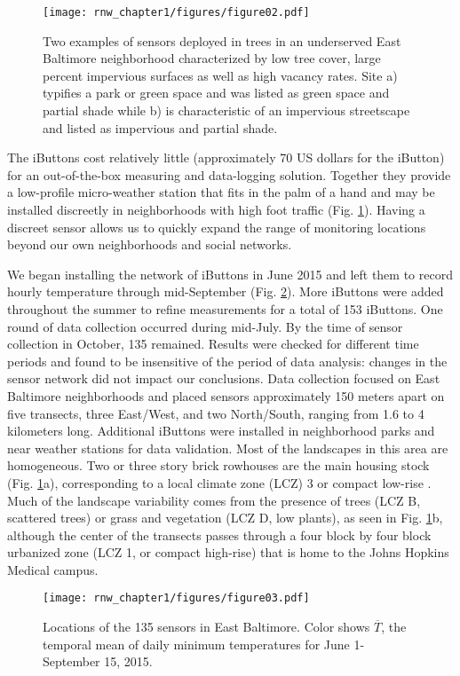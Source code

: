 \begin{figure}
\noindent\texttt{[image: rnw\_chapter1/figures/figure02.pdf]}
\caption{Two examples of sensors deployed in trees in an underserved East Baltimore neighborhood characterized by low tree cover, large percent impervious surfaces as well as high vacancy rates. Site a) typifies a park or green space and was listed as green space and partial shade while b) is characteristic of an impervious streetscape and listed as impervious and partial shade. }\label{pictures}
\end{figure}

The iButtons cost relatively little (approximately 70 US dollars for the iButton) for an out-of-the-box measuring and data-logging solution. Together they provide a low-profile micro-weather station that fits in the palm of a hand and may be installed discreetly in neighborhoods with high foot traffic (Fig. \ref{pictures}). Having a discreet sensor allows us to quickly expand the range of monitoring locations beyond our own neighborhoods and social networks. 

We began installing the network of iButtons in June 2015 and left them to record hourly temperature through mid-September (Fig. \ref{fig:mapmean1}). More iButtons were added throughout the summer to refine measurements for a total of 153 iButtons.  One round of data collection occurred during mid-July. By the time of sensor collection in October, 135 remained. Results were checked for different time periods and found to be insensitive of the period of data analysis: changes in the sensor network did not impact our conclusions. Data collection focused on East Baltimore neighborhoods and placed sensors approximately 150 meters apart on five transects, three East/West, and two North/South, ranging from 1.6 to 4 kilometers long. Additional iButtons were installed in neighborhood parks and near weather stations for data validation. Most of the landscapes in this area are homogeneous.  Two or three story brick rowhouses are the main housing stock (Fig. \ref{pictures}a), corresponding to a local climate zone (LCZ) 3 or compact low-rise \citep{lcz}. Much of the landscape variability comes from the presence of trees (LCZ B, scattered trees) or grass and vegetation (LCZ D, low plants), as seen in Fig. \ref{pictures}b, although the center of the transects passes through a four block by four block urbanized zone (LCZ 1, or compact high-rise) that is home to the Johns Hopkins Medical campus. 

\begin{figure}
\noindent\texttt{[image: rnw\_chapter1/figures/figure03.pdf]}
\caption{Locations of the 135 sensors in East Baltimore. Color shows $\overline{T}$, the temporal mean of daily minimum temperatures for June 1-September 15, 2015.}
\label{fig:mapmean1}
\end{figure}

